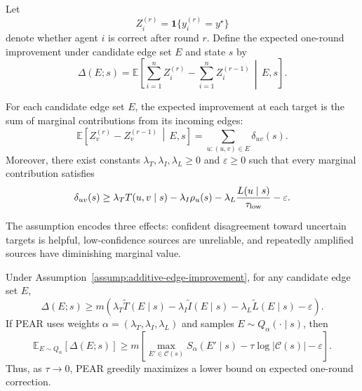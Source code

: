 Let
\[
    Z_i^{(r)}=\mathbf 1\{y_i^{(r)}=y^\star\}
\]
denote whether agent $i$ is correct after round $r$. Define the expected
one-round improvement under candidate edge set $E$ and state $s$ by
\[
    \Delta(E;s)
    =
    \mathbb E\left[
    \sum_{i=1}^n Z_i^{(r)}
    -
    \sum_{i=1}^n Z_i^{(r-1)}
    \,\middle|\, E,s
    \right].
\]

\begin{assumption}
\label{assump:additive-edge-improvement}
For each candidate edge set $E$, the expected improvement at each target is the
sum of marginal contributions from its incoming edges:
\[
    \mathbb E\left[
    Z_v^{(r)}-Z_v^{(r-1)}
    \,\middle|\, E,s
    \right]
    =
    \sum_{u:(u,v)\in E}\delta_{uv}(s).
\]
Moreover, there exist constants
$\lambda_T,\lambda_I,\lambda_L\ge0$ and $\varepsilon\ge0$ such that every
marginal contribution satisfies
\[
    \delta_{uv}(s)
    \ge
    \lambda_T T(u,v\mid s)
    -
    \lambda_I\rho_u(s)
    -
    \lambda_L\frac{L(u\mid s)}{\tau_{\rm low}}
    -
    \varepsilon .
\]
\end{assumption}

The assumption encodes three effects: confident disagreement toward uncertain
targets is helpful, low-confidence sources are unreliable, and repeatedly
amplified sources have diminishing marginal value.

\begin{theorem}
\label{thm:surrogate-appendix}
Under Assumption~\ref{assump:additive-edge-improvement}, for any candidate edge
set $E$,
\[
    \Delta(E;s)
    \ge
    m\left(
    \lambda_T\widetilde T(E\mid s)
    -
    \lambda_I\widetilde I(E\mid s)
    -
    \lambda_L\widetilde L(E\mid s)
    -
    \varepsilon
    \right).
\]
If PEAR uses weights
$\alpha=(\lambda_T,\lambda_I,\lambda_L)$ and samples
$E\sim Q_\alpha(\cdot\mid s)$, then
\[
    \mathbb E_{E\sim Q_\alpha}[\Delta(E;s)]
    \ge
    m\left[
    \max_{E'\in\mathcal C(s)}S_\alpha(E'\mid s)
    -
    \tau\log|\mathcal C(s)|
    -
    \varepsilon
    \right].
\]
Thus, as $\tau\to0$, PEAR greedily maximizes a lower bound on expected
one-round correction.
\end{theorem}

